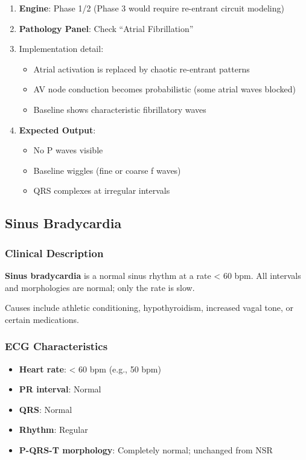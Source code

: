 \documentclass[12pt,a4paper,oneside]{book}
\begin{document}
\begin{enumerate}
    \item \textbf{Engine}: Phase 1/2 (Phase 3 would require re-entrant circuit modeling)
    \item \textbf{Pathology Panel}: Check ``Atrial Fibrillation''
    \item Implementation detail:
    \begin{itemize}
        \item Atrial activation is replaced by chaotic re-entrant patterns
        \item AV node conduction becomes probabilistic (some atrial waves blocked)
        \item Baseline shows characteristic fibrillatory waves
    \end{itemize}
    \item \textbf{Expected Output}:
    \begin{itemize}
        \item No P waves visible
        \item Baseline wiggles (fine or coarse f waves)
        \item QRS complexes at irregular intervals
    \end{itemize}
\end{enumerate}

\subsection{Sinus Bradycardia}

\subsubsection{Clinical Description}

\textbf{Sinus bradycardia} is a normal sinus rhythm at a rate < 60 bpm. All intervals and morphologies are normal; only the rate is slow.

Causes include athletic conditioning, hypothyroidism, increased vagal tone, or certain medications.

\subsubsection{ECG Characteristics}

\begin{itemize}
    \item \textbf{Heart rate}: < 60 bpm (e.g., 50 bpm)
    \item \textbf{PR interval}: Normal
    \item \textbf{QRS}: Normal
    \item \textbf{Rhythm}: Regular
    \item \textbf{P-QRS-T morphology}: Completely normal; unchanged from NSR
\end{itemize}
\end{document}
